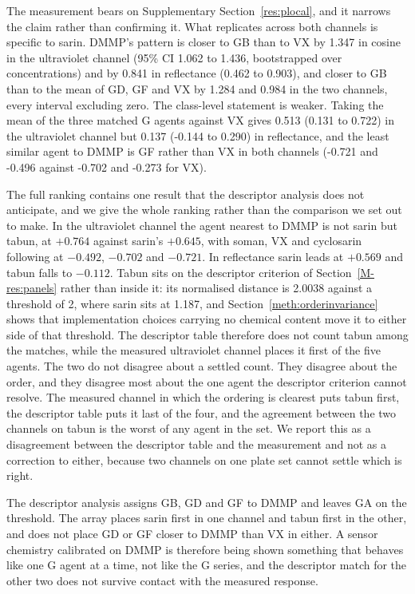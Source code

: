 \documentclass[journal=jacsat,manuscript=suppinfo,margin=1in]{achemso}
\begin{document}
The measurement bears on Supplementary Section~\ref{res:plocal}, and it narrows the claim
rather than confirming it. What replicates across both channels is specific to
sarin. DMMP's pattern is closer to GB than to VX by 1.347 in cosine in the
ultraviolet channel (95\% CI 1.062 to 1.436, bootstrapped over concentrations)
and by 0.841 in reflectance (0.462 to 0.903), and closer to GB than to the mean
of GD, GF and VX by 1.284 and 0.984 in the two channels, every interval
excluding zero. The class-level statement is weaker. Taking the mean of the
three matched G agents against VX gives 0.513 (0.131 to 0.722) in the
ultraviolet channel but 0.137 (-0.144 to 0.290) in reflectance, and the least
similar agent to DMMP is GF rather than VX in both channels (-0.721 and -0.496
against -0.702 and -0.273 for VX).

The full ranking contains one result that the descriptor analysis does not
anticipate, and we give the whole ranking rather than the comparison we set out
to make. In the ultraviolet channel the agent nearest to DMMP is not sarin but
tabun, at $+0.764$ against sarin's $+0.645$, with soman, VX and cyclosarin
following at $-0.492$, $-0.702$ and $-0.721$. In reflectance sarin leads at
$+0.569$ and tabun falls to $-0.112$. Tabun sits on the descriptor criterion of
Section~\ref{M-res:panels} rather than inside it: its normalised distance is
2.0038 against a threshold of 2, where sarin sits at 1.187, and
Section~\ref{meth:orderinvariance} shows that implementation choices carrying no
chemical content move it to either side of that threshold. The descriptor table
therefore does not count tabun among the matches, while the measured ultraviolet
channel places it first of the five agents. The two do not disagree about a
settled count. They disagree about the order, and they disagree most about the
one agent the descriptor criterion cannot resolve. The measured channel in which the
ordering is clearest puts tabun first, the descriptor table puts it last of the
four, and the agreement between the two channels on tabun is the worst of any
agent in the set.
We report this as a disagreement between the descriptor table and the measurement
and not as a correction to either, because two channels on one plate set cannot
settle which is right.

The descriptor analysis assigns GB, GD and GF to DMMP and leaves GA on the
threshold. The array places sarin first in one channel and tabun first in the
other, and does not place GD or GF closer to DMMP than VX in either. A sensor chemistry calibrated on DMMP is
therefore being shown something that behaves like one G agent at a time, not like
the G series, and the descriptor match for the other two does not survive contact
with the measured response.
\end{document}
